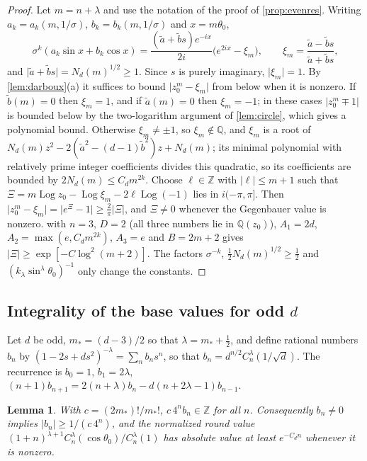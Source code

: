 \documentclass[11pt]{amsart}
\numberwithin{equation}{section}
\newtheorem{lemma}[theorem]{Lemma}
\theoremstyle{definition}
\theoremstyle{remark}
\newcommand{\Z}{\mathbb{Z}}
\newcommand{\Q}{\mathbb{Q}}
\newcommand{\abs}[1]{\lvert #1\rvert}
\newcommand{\Log}{\operatorname{Log}}
\begin{document}
\begin{proof}
Let $m=n+\lambda$ and use the notation of the proof of \cref{prop:evenres}. Writing $a_k=a_k(m,1/\sigma)$, $b_k=b_k(m,1/\sigma)$ and $x=m\theta_0$,
\[
\sigma^k(a_k\sin x+b_k\cos x)=\frac{(\tilde a+\tilde bs)e^{-ix}}{2i}\bigl(e^{2ix}-\xi_m\bigr),\qquad\xi_m=\frac{\tilde a-\tilde bs}{\tilde a+\tilde bs},
\]
and $\abs{\tilde a+\tilde bs}=N_d(m)^{1/2}\ge1$. Since $s$ is purely imaginary, $\abs{\xi_m}=1$. By \cref{lem:darboux}(a) it suffices to bound $\abs{z_0^m-\xi_m}$ from below when it is nonzero. If $\tilde b(m)=0$ then $\xi_m=1$, and if $\tilde a(m)=0$ then $\xi_m=-1$; in these cases $\abs{z_0^m\mp1}$ is bounded below by the two-logarithm argument of \cref{lem:circle}, which gives a polynomial bound. Otherwise $\xi_m\ne\pm1$, so $\xi_m\notin\Q$, and $\xi_m$ is a root of $N_d(m)z^2-2(\tilde a^2-(d-1)\tilde b^2)z+N_d(m)$; its minimal polynomial with relatively prime integer coefficients divides this quadratic, so its coefficients are bounded by $2N_d(m)\le C_dm^{2k}$. Choose $\ell\in\Z$ with $\abs\ell\le m+1$ such that $\Xi=m\Log z_0-\Log\xi_m-2\ell\Log(-1)$ lies in $i(-\pi,\pi]$. Then $\abs{z_0^m-\xi_m}=\abs{e^\Xi-1}\ge\frac2\pi\abs\Xi$, and $\Xi\ne0$ whenever the Gegenbauer value is nonzero.  with $n=3$, $D=2$ (all three numbers lie in $\Q(z_0)$), $A_1=2d$, $A_2=\max(e,C_dm^{2k})$, $A_3=e$ and $B=2m+2$ gives $\abs\Xi\ge\exp[-C\log^2(m+2)]$. The factors $\sigma^{-k}$, $\frac12N_d(m)^{1/2}\ge\frac12$ and $(k_\lambda\sin^\lambda\theta_0)^{-1}$ only change the constants.
\end{proof}

\subsection{Integrality of the base values for odd \texorpdfstring{$d$}{d}}
Let $d$ be odd, $m_*=(d-3)/2$ so that $\lambda=m_*+\frac12$, and define rational numbers $b_n$ by $(1-2s+ds^2)^{-\lambda}=\sum_nb_ns^n$, so that $b_n=d^{n/2}C_n^\lambda(1/\sqrt d)$. The recurrence is $b_0=1$, $b_1=2\lambda$, $(n+1)b_{n+1}=2(n+\lambda)b_n-d(n+2\lambda-1)b_{n-1}$.

\begin{lemma}\label{lem:integral}
With $c=(2m_*)!/m_*!$, $c\,4^nb_n\in\Z$ for all $n$. Consequently $b_n\ne0$ implies $\abs{b_n}\ge1/(c\,4^n)$, and the normalized round value $(1+n)^{\lambda+1}C_n^\lambda(\cos\theta_0)/C_n^\lambda(1)$ has absolute value at least $e^{-C_dn}$ whenever it is nonzero.
\end{lemma}
\end{document}
